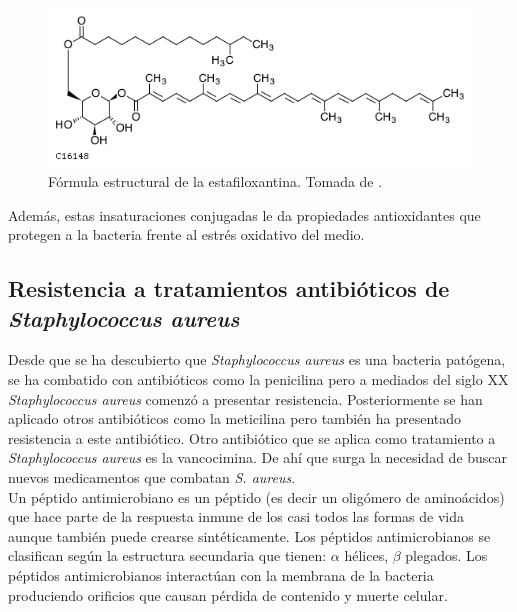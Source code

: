 \documentclass[12pt]{article}
\begin{document}
\begin{figure}[h]
\begin{center}
  \includegraphics[scale=0.4]{staphyloxanthin.png}
  \caption{Fórmula estructural de la estafiloxantina. Tomada de \cite{KEGGC16148}.}
  \label{fig:stx}
\end{center}
\end{figure}
 Adem\'{a}s, estas insaturaciones conjugadas le da propiedades antioxidantes que protegen a la bacteria frente al estrés oxidativo del medio.
\subsection{Resistencia a tratamientos antibióticos de \textit{Staphylococcus aureus}}\label{ss:anti}
Desde que se ha descubierto que \textit{Staphylococcus aureus} es una bacteria patógena, se ha combatido con antibióticos como la penicilina pero a mediados del siglo XX \textit{Staphylococcus aureus} comenzó a presentar resistencia. Posteriormente se han aplicado otros antibióticos como la meticilina pero también ha presentado resistencia a este antibiótico. Otro antibiótico que se aplica como tratamiento a \textit{Staphylococcus aureus}  es la vancocimina. De ahí que surga la necesidad de buscar nuevos medicamentos que combatan \textit{S. aureus}.\\

Un p\'eptido antimicrobiano es un p\'eptido (es decir un olig\'omero de amino\'acidos) que hace parte de la respuesta inmune de los casi todos las formas de vida aunque también puede crearse sintéticamente. Los péptidos antimicrobianos se clasifican según la estructura secundaria que tienen: $\alpha$ h\'elices, $\beta$ plegados.   Los p\'eptidos antimicrobianos interact\'uan con la membrana de la bacteria produciendo orificios que causan p\'erdida de contenido y muerte celular.\\
\end{document}
